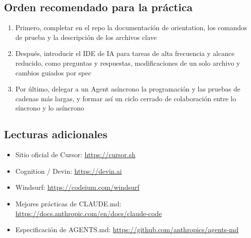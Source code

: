 \documentclass[a4paper]{article}
\begin{document}
\subsection{Orden recomendado para la práctica}

\begin{enumerate}
    \item Primero, completar en el repo la documentación de orientation, los comandos de prueba y la descripción de los archivos clave
    \item Después, introducir el IDE de IA para tareas de alta frecuencia y alcance reducido, como preguntas y respuestas, modificaciones de un solo archivo y cambios guiados por spec
    \item Por último, delegar a un Agent asíncrono la programación y las pruebas de cadenas más largas, y formar así un ciclo cerrado de colaboración entre lo síncrono y lo asíncrono
\end{enumerate}

\subsection{Lecturas adicionales}

\begin{itemize}
    \item Sitio oficial de Cursor: \url{https://cursor.sh}
    \item Cognition / Devin: \url{https://devin.ai}
    \item Windsurf: \url{https://codeium.com/windsurf}
    \item Mejores prácticas de CLAUDE.md: \url{https://docs.anthropic.com/en/docs/claude-code}
    \item Especificación de AGENTS.md: \url{https://github.com/anthropics/agents-md}
\end{itemize}

\end{document}
